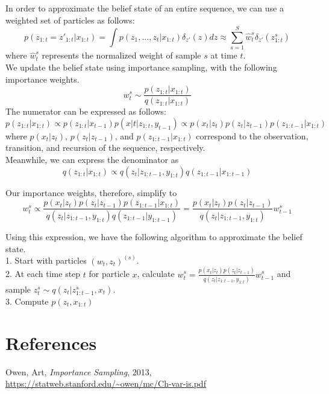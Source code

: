 \documentclass{article}
\begin{document}
In order to approximate the belief state of an entire sequence, we can use a weighted set of particles as follows:  
\[p(z_{1:t}=z'_{1:t}|x_{1:t}) = \int p(z_1,...,z_t|x_{1:t})\delta_{z'}(z)dz \approx \sum_{s=1}^S \hat{w}_t^s \delta_{z'}(z^s_{1:t})\]
where $\hat{w}_t^s$ represents the normalized weight of sample $s$ at time $t$. \\

We update the belief state using importance sampling, with the following importance weights. 
\[w_t^s \sim \frac{p(z_{1:t}|x_{1:t})}{q(z_{1:t}|x_{1:t})}\]
The numerator can be expressed as follows: 
\[p(z_{1:t}|x_{1:t}) \propto p(z_{1:t}|x_{t-1})p(x|t|z_{1:t},y_{t-1}) \propto p(x_t|z_t)p(z_t|z_{t-1})p(z_{1:t-1}|x_{1:t})\]
where $p(x_t|z_t)$, $p(z_t|z_{t-1})$, and $p(z_{1:t-1}|x_{1:t})$ correspond to the observation, transition, and recursion of the sequence, respectively. \\

Meanwhile, we can express the denominator as
\[q(z_{1:t}|x_{1:t}) \propto q(z_t|z_{1:t-1},y_{1:t})q(z_{1:t-1}|x_{1:t-1})\]

Our importance weights, therefore, simplify to
\[w_t^s \propto \frac{p(x_t|z_t)p(z_t|z_{t-1})p(z_{1:t-1}|x_{1:t})}{q(z_t|z_{1:t-1},y_{1:t})q(z_{1:t-1}|y_{1:t-1})} = \frac{p(x_t|z_t)p(z_t|z_{t-1})}{q(z_t|z_{1:t-1},y_{1:t})}w_{t-1}^s\]

Using this expression, we have the following algorithm to approximate the belief state. \\
1. Start with particles $(w_t,z_t)^{(s)}$. \\
2. At each time step $t$ for particle $x$, calculate $w_t^s = \frac{p(x_t|z_t)p(z_t|z_{t-1})}{q(z_t|z_{1:t-1},y_{1:t})}w_{t-1}^s$ and sample $z_t^s \sim q(z_t|z^s_{1:t-1},x_t)$. \\
3. Compute $p(z_t,x_{1:t})$

\section*{References}
Owen, Art, \textit{Importance Sampling}, 2013, \url{https://statweb.stanford.edu/~owen/mc/Ch-var-is.pdf}
\end{document}
